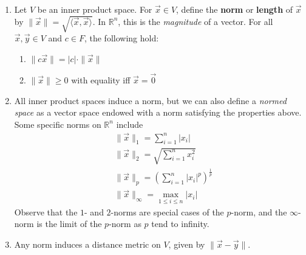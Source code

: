 \documentclass[10pt]{article}
\begin{document}
\begin{multicols*}{2}
\begin{enumerate}
\begin{enumerate}
        
        \item Let $V$ be an inner product space. For $\vec{x} \in V$, define the \textbf{norm} or \textbf{length} of $\vec{x}$ by $\| \vec{x} \| = \sqrt{ \langle \vec{x}, \vec{x} \rangle }$. In $\mathbb{R}^n$, this is the \textit{magnitude} of a vector. For all $\vec{x}, \vec{y} \in V$ and $c \in F$, the following hold:
        \begin{enumerate}
            \item $\| c\vec{x} \| = |c| \cdot \| \vec{x} \|$
            \item $\| \vec{x} \| \geq 0$ with equality iff $\vec{x}=\vec{0}$
        \end{enumerate}
        
        \item All inner product spaces induce a norm, but we can also define a \textit{normed space} as a vector space endowed with a norm satisfying the properties above. Some specific norms on $\mathbb{R}^n$ include
        \begin{align*}
            &\| \vec{x} \|_1 = \sum_{i=1}^n | x_i | \\
            &\| \vec{x} \|_2 = \sqrt{\sum_{i=1}^n  x_i^2 } \\
            &\| \vec{x} \|_p = \left( \sum_{i=1}^n  |x_i|^p  \right)^\frac{1}{p} \\
            &\| \vec{x} \|_\infty = \max_{1 \leq i \leq n} |x_i|
        \end{align*}
        Observe that the $1$- and $2$-norms are special cases of the $p$-norm, and the $\infty$-norm is the limit of the $p$-norm as $p$ tend to infinity.
        \item Any norm induces a distance metric on $V$, given by $\| \vec{x} - \vec{y} \|$.
        

\end{enumerate}
\end{enumerate}
\end{multicols*}
\end{document}
